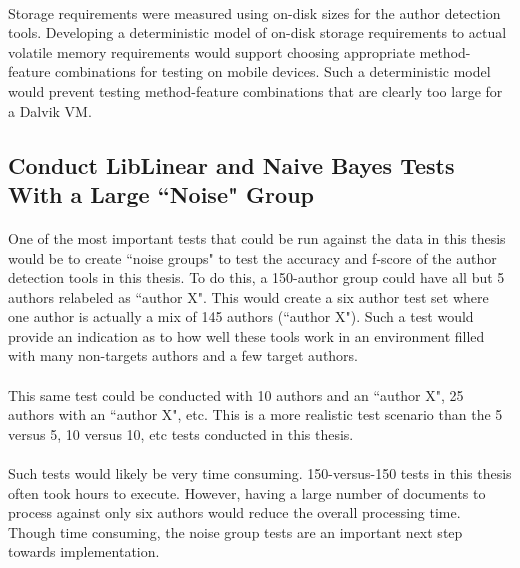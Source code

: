 	\paragraph*{} Storage requirements were measured using on-disk sizes for the author detection tools.  Developing a deterministic model of on-disk storage requirements to actual volatile memory requirements would support choosing appropriate method-feature combinations for testing on mobile devices.  Such a deterministic model would prevent testing method-feature combinations that are clearly too large for a Dalvik VM.

\begin{singlespace}
\subsection{Conduct LibLinear and Naive Bayes Tests With a Large ``Noise" Group}
\end{singlespace}
\paragraph*{} One of the most important tests that could be run against the data in this thesis would be to create ``noise groups" to test the accuracy and f-score of the author detection tools in this thesis.  To do this, a 150-author group could have all but 5 authors relabeled as ``author X".  This would create a six author test set where one author is actually a mix of 145 authors (``author X").  Such a test would provide an indication as to how well these tools work in an environment filled with many non-targets authors and a few target authors.
\paragraph*{} This same test could be conducted with 10 authors and an ``author X", 25 authors with an ``author X", etc.  This is a more realistic test scenario than the 5 versus 5, 10 versus 10, etc tests conducted in this thesis.  
\paragraph*{} Such tests would likely be very time consuming.  150-versus-150 tests in this thesis often took hours to execute. However, having a large number of documents to process against only six authors would reduce the overall processing time.  Though time consuming, the noise group tests are an important next step towards implementation.

